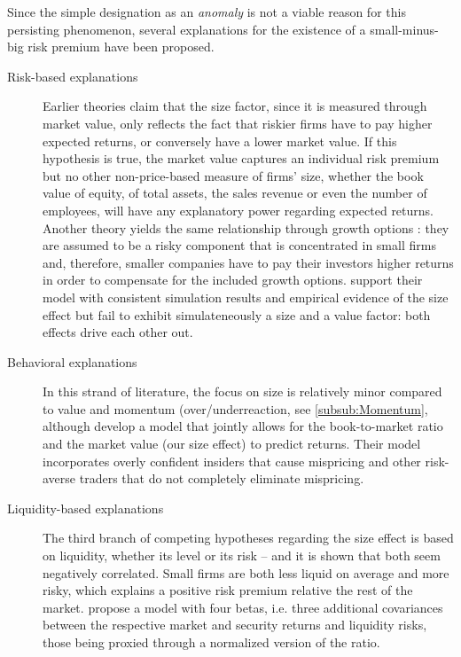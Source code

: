 Since the simple designation as an \emph{anomaly} is not a viable reason for this persisting phenomenon, several explanations for the existence of a small-minus-big risk premium have been proposed.
\begin{description}
\item[Risk-based explanations] Earlier theories \parencite{Berk1995} claim that the size factor, since it is measured through market value, only reflects the fact that riskier firms have to pay higher expected returns, or conversely have a lower market value. If this hypothesis is true, the market value captures an individual risk premium but no other non-price-based measure of firms' size, whether the book value of equity, of total assets, the sales revenue or even the number of employees, will have any explanatory power regarding expected returns. Another theory yields the same relationship through growth options : they are assumed to be a risky component that is concentrated in small firms and, therefore, smaller companies have to pay their investors higher returns in order to compensate for the included growth options. \textcite{Garleanu2012} support their model with consistent simulation results and empirical evidence of the size effect but fail to exhibit simulateneously a size and a value factor: both effects drive each other out.
\item[Behavioral explanations] In this strand of literature, the focus on size is relatively minor compared to value and momentum (over/underreaction, see \autoref{subsub:Momentum}, although \textcite{Daniel2001} develop a model that jointly allows for the book-to-market ratio and the market value (our size effect) to predict returns. Their model incorporates overly confident insiders that cause mispricing and other risk-averse traders that do not completely eliminate mispricing.   
\item[Liquidity-based explanations] The third branch of competing hypotheses regarding the size effect is based on liquidity, whether its level or its risk -- and it is shown that both seem negatively correlated. Small firms are both less liquid on average and more risky, which explains a positive risk premium relative the rest of the market. \textcite{Acharya2005} propose a model with four betas, i.e. three additional covariances between the respective market and security returns and liquidity risks, those being proxied through a normalized version of the \textcite{Amihud2002} ratio.
\end{description}

